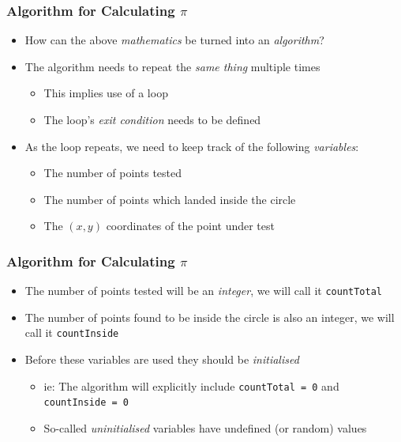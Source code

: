 \documentclass[14pt]{beamer}
\begin{document}
\begin{frame}
\frametitle{Algorithm for Calculating $\pi$}

\begin{itemize}
\item How can the above \textit{mathematics} be turned into an \textit{algorithm}?
\item The algorithm needs to repeat the \textit{same thing} multiple times
	\begin{itemize}
			\item This implies use of a loop
			\item The loop's \textit{exit condition} needs to be defined
	\end{itemize}
\item As the loop repeats, we need to keep track of the following \textit{variables}:
		\begin{itemize}
			\item The number of points tested
			\item The number of points which landed inside the circle
			\item The $(x,y)$ coordinates of the point under test
		\end{itemize}


\end{itemize}	 
\end{frame}

\begin{frame}
\frametitle{Algorithm for Calculating $\pi$}
\begin{itemize}
\item The number of points tested will be an \textit{integer}, we will call it \texttt{countTotal}
\item The number of points found to be inside the circle is also an integer, we will call it \texttt{countInside}
\item Before these variables are used they should be \textit{initialised}
	\begin{itemize}
		\item ie: The algorithm will explicitly include \texttt{countTotal = 0} and \texttt{countInside = 0}
		\item So-called \textit{uninitialised} variables have undefined (or random) values
	\end{itemize}
\end{itemize}
\end{frame}
\end{document}
